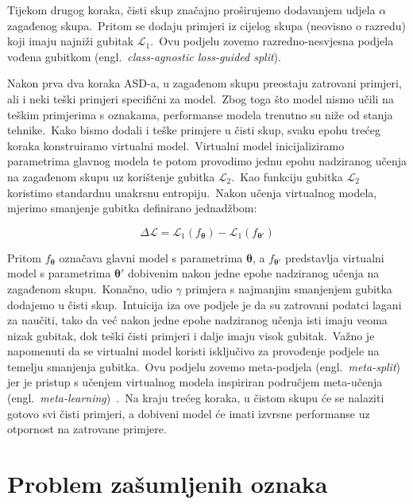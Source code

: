 \documentclass[diplomskirad]{fer}
\begin{document}
Tijekom drugog koraka, čisti skup značajno proširujemo dodavanjem udjela $\alpha$ zagađenog skupa.\ 
Pritom se dodaju primjeri iz cijelog skupa (neovisno o razredu) koji imaju najniži gubitak $\mathcal{L}_1$.\ 
Ovu podjelu zovemo razredno-nesvjesna podjela vođena gubitkom (engl.\ \textit{class-agnostic loss-guided split}).\ 
  
Nakon prva dva koraka ASD-a, u zagađenom skupu preostaju zatrovani primjeri, ali i neki teški primjeri specifični za model.\ 
Zbog toga što model nismo učili na teškim primjerima s oznakama, performanse modela trenutno su niže od stanja tehnike.\ Kako bismo dodali i teške primjere u čisti skup, svaku epohu trećeg koraka konstruiramo virtualni model.\ 
Virtualni model inicijaliziramo parametrima glavnog modela te potom provodimo jednu epohu nadziranog učenja na zagađenom skupu uz korištenje gubitka $\mathcal{L}_2$.\ Kao funkciju gubitka $\mathcal{L}_2$ koristimo standardnu unakrsnu entropiju.\ 
Nakon učenja virtualnog modela, mjerimo smanjenje gubitka definirano jednadžbom:

\begin{equation}
  \Delta \mathcal{L} = \mathcal{L}_1(f_{\bm{\theta}}) - \mathcal{L}_1(f_{\bm{\theta'}})
  \label{eq:asd}
\end{equation}

Pritom $f_{\bm{\theta}}$ označava glavni model s parametrima $\bm{\theta}$, a $f_{\bm{\theta'}}$ predstavlja virtualni model s parametrima $\bm{\theta'}$ dobivenim nakon jedne epohe nadziranog učenja na zagađenom skupu.\ 
Konačno, udio $\gamma$ primjera s najmanjim smanjenjem gubitka dodajemo u čisti skup.\ Intuicija iza ove podjele je da su zatrovani podatci lagani za naučiti, tako da već nakon jedne epohe nadziranog učenja isti imaju veoma nizak gubitak, dok teški čisti primjeri i dalje imaju visok gubitak.\ 
Važno je napomenuti da se virtualni model koristi isključivo za provođenje podjele na temelju smanjenja gubitka.\ 
Ovu podjelu zovemo meta-podjela (engl.\ \textit{meta-split}) jer je pristup s učenjem virtualnog modela inspiriran područjem meta-učenja (engl.\ \textit{meta-learning})~\cite{vilalta2002perspective}.\
Na kraju trećeg koraka, u čistom skupu će se nalaziti gotovo svi čisti primjeri, a dobiveni model će imati izvrsne performanse uz otpornost na zatrovane primjere.\

\chapter{Problem zašumljenih oznaka}
\label{pog:zasumljeni}
\end{document}
